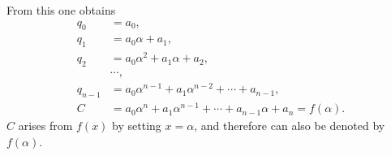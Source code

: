 From this one obtains
\begin{equation}
\begin{aligned}
 q_0&=a_0,\\
 q_1&=a_0\alpha+a_1,\\
 q_2&=a_0\alpha^2+a_1\alpha+a_2,\\
 &\cdots,\\
 q_{n-1}&=a_0\alpha^{n-1}+a_1\alpha^{n-2}+\cdots+a_{n-1},\\
 C&=a_0\alpha^n+a_1\alpha^{n-1}+\cdots+a_{n-1}\alpha+a_n=f(\alpha).
\end{aligned}
\tag{6}
\end{equation}
$C$ arises from $f(x)$ by setting $x=\alpha$, and therefore can also
be denoted by $f(\alpha)$.
\endgroup
